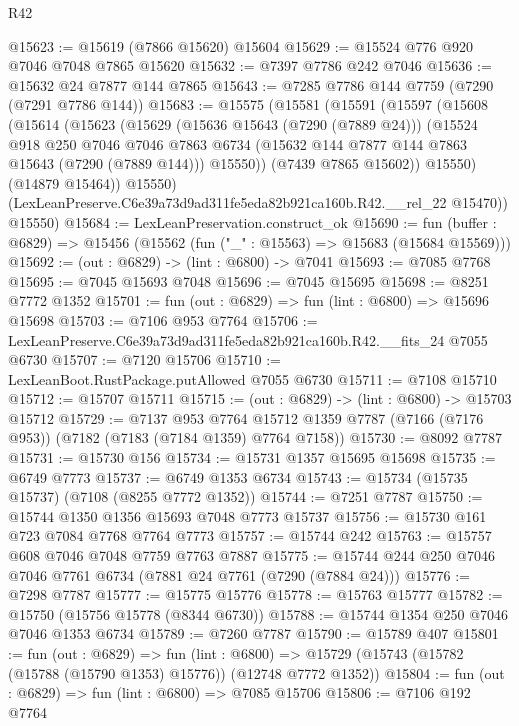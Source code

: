 \begin{lexlean}{R42}
\begin{coremodule}
{@15623 := @15619 (@7866 @15620) @15604
@15629 := @15524 @776 @920 @7046 @7048 @7865 @15620
@15632 := @7397 @7786 @242 @7046
@15636 := @15632 @24 @7877 @144 @7865
@15643 := @7285 @7786 @144 @7759 (@7290 (@7291 @7786 @144))
@15683 := @15575
    (@15581
      (@15591
        (@15597
          (@15608
            (@15614
              (@15623
                (@15629
                  (@15636 @15643 (@7290 (@7889 @24)))
                  (@15524
                    @918
                    @250
                    @7046
                    @7046
                    @7863
                    @6734
                    (@15632 @144 @7877 @144 @7863 @15643 (@7290 (@7889 @144)))
                    @15550))
                (@7439 @7865 @15602))
              @15550)
            (@14879 @15464))
          @15550)
        (LexLeanPreserve.C6e39a73d9ad311fe5eda82b921ca160b.R42.__rel_22 @15470))
      @15550)
@15684 := LexLeanPreservation.construct_ok
@15690 := fun (buffer : @6829) => @15456 (@15562 (fun ("_" : @15563) => @15683 (@15684 @15569)))
@15692 := (out : @6829) -> (lint : @6800) -> @7041
@15693 := @7085 @7768
@15695 := @7045 @15693 @7048
@15696 := @7045 @15695
@15698 := @8251 @7772 @1352
@15701 := fun (out : @6829) => fun (lint : @6800) => @15696 @15698
@15703 := @7106 @953 @7764
@15706 := LexLeanPreserve.C6e39a73d9ad311fe5eda82b921ca160b.R42.__fits_24 @7055 @6730
@15707 := @7120 @15706
@15710 := LexLeanBoot.RustPackage.putAllowed @7055 @6730
@15711 := @7108 @15710
@15712 := @15707 @15711
@15715 := (out : @6829) -> (lint : @6800) -> @15703 @15712
@15729 := @7137
    @953
    @7764
    @15712
    @1359
    @7787
    (@7166 (@7176 @953))
    (@7182 (@7183 (@7184 @1359) @7764 @7158))
@15730 := @8092 @7787
@15731 := @15730 @156
@15734 := @15731 @1357 @15695 @15698
@15735 := @6749 @7773
@15737 := @6749 @1353 @6734
@15743 := @15734 (@15735 @15737) (@7108 (@8255 @7772 @1352))
@15744 := @7251 @7787
@15750 := @15744 @1350 @1356 @15693 @7048 @7773 @15737
@15756 := @15730 @161 @723 @7084 @7768 @7764 @7773
@15757 := @15744 @242
@15763 := @15757 @608 @7046 @7048 @7759 @7763 @7887
@15775 := @15744 @244 @250 @7046 @7046 @7761 @6734 (@7881 @24 @7761 (@7290 (@7884 @24)))
@15776 := @7298 @7787
@15777 := @15775 @15776
@15778 := @15763 @15777
@15782 := @15750 (@15756 @15778 (@8344 @6730))
@15788 := @15744 @1354 @250 @7046 @7046 @1353 @6734
@15789 := @7260 @7787
@15790 := @15789 @407
@15801 := fun (out : @6829) =>
  fun (lint : @6800) => @15729 (@15743 (@15782 (@15788 (@15790 @1353) @15776)) (@12748 @7772 @1352))
@15804 := fun (out : @6829) => fun (lint : @6800) => @7085 @15706
@15806 := @7106 @192 @7764
}
\end{coremodule}
\end{lexlean}
